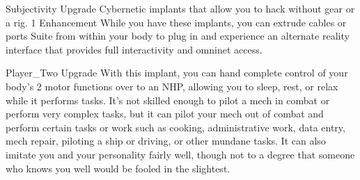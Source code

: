 Subjectivity          Upgrade      Cybernetic implants that allow you to hack without gear or a rig.                 1 
Enhancement                        While you have these implants, you can extrude cables or ports  
Suite                              from within your body to plug in and experience an alternate  
                                   reality interface that provides full interactivity and omninet access. 

Player\_Two            Upgrade      With this implant, you can hand complete control of your body’s                   2 
                                   motor functions over to an NHP, allowing you to sleep, rest, or  
                                   relax while it performs tasks. It’s not skilled enough to pilot a  
                                   mech in combat or perform very complex tasks, but it can pilot  
                                   your mech out of combat and perform certain tasks or work such  
                                   as cooking, administrative work, data entry, mech repair, piloting a  
                                   ship or driving, or other mundane tasks. It can also imitate you  
                                   and your personality fairly well, though not to a degree that  
                                   someone who knows you well would be fooled in the slightest. 
